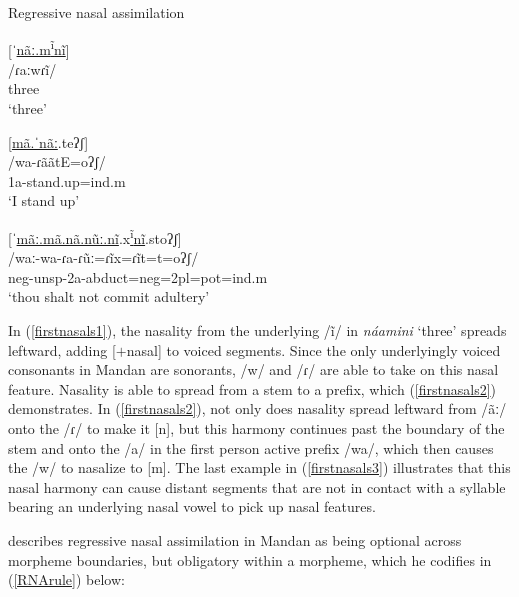 \begin{exe}
\item\label{firstnasals} Regressive nasal assimilation
	\begin{xlist}
	\item\label{firstnasals1}
	\glll \textnormal{[ˈ\uline{nãː.m\textsuperscript{ĩ}nĩ}]}\\
	/ɾaːwɾĩ/\\
	\textnormal{three}\\
	\glt `three'

	\item\label{firstnasals2}
	\glll \textnormal{[\uline{mã.ˈnãː}.teʔʃ]}\\
	/wa-ɾããtE=oʔʃ/\\
	1a-\textnormal{stand.up}=ind.m\\
	\glt  `I stand up' \citep[173]{hollow1970}

	\item\label{firstnasals3}
	\glll \textnormal{[ˈ\uline{mãː.mã.nã.nũː.nĩ}.x\uline{\textsuperscript{ĩ}nĩ}.stoʔʃ]}\\
	 /waː-wa-ɾa-ɾũː=ɾĩx=ɾĩt=t=oʔʃ/\\
	 neg-unsp-2a-\textnormal{abduct}=neg=2pl=pot=ind.m\\
	 \glt `thou shalt not commit adultery' \citep[22]{hollow1970}
	\end{xlist}
\end{exe}

In (\ref{firstnasals1}), the nasality from the underlying /ĩ/ in \textit{náamini} `three' spreads leftward, adding [$+$nasal] to voiced segments. Since the only underlyingly voiced consonants in Mandan are sonorants, /w/ and /ɾ/ are able to take on this nasal feature. Nasality is able to spread from a stem to a prefix, which (\ref{firstnasals2}) demonstrates. In (\ref{firstnasals2}), not only does nasality spread leftward from /ãː/ onto the /ɾ/ to make it [n], but this harmony continues past the boundary of the stem and onto the /a/ in the first person active prefix /wa/, which then causes the /w/ to nasalize to [m]. The last example in (\ref{firstnasals3}) illustrates that this nasal harmony can cause distant segments that are not in contact with a syllable bearing an underlying nasal vowel to pick up nasal features.

\citet[21]{hollow1970} describes regressive nasal assimilation in Mandan as being optional across morpheme boundaries, but obligatory within a morpheme, which he codifies in (\ref{RNArule}) below:

